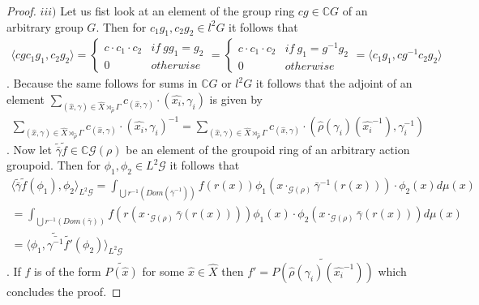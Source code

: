 \documentclass[12pt,a4paper]{scrartcl}
\numberwithin{equation}{section}
\newcommand{\C}{\mathbb{C}} %
\newcommand{\2}{\mathbb{Z} / 2 \mathbb{Z}}
\newcommand{\G}{\mathcal{G}}
\newcommand{\1}{\bar{1}}
\newcommand{\0}{\bar{0}}
\begin{document}
\begin{proof}
	$iii)$ Let us fist look at an element of the group ring $c g \in \C G$ of an arbitrary group $G$. Then for $c_1 g_1, c_2 g_2 \in l^2G$ it follows that 
	\begin{align*}
		\langle c g c_1 g_1, c_2 g_2 \rangle = \begin{cases}
		 	c \cdot c_1 \cdot c_2 & if \ g g_1 = g_2 \\
		 	0 & otherwise
		\end{cases}  = \begin{cases}
		c \cdot c_1 \cdot c_2 & if \ g_1 = g^{-1} g_2 \\
		0 & otherwise
		\end{cases}
		= \langle  c_1 g_1, c g^{-1} c_2 g_2 \rangle
	\end{align*}.
	Because the same follows for sums in $\C G$ or $l^2 G$ it follows that the adjoint of an element $\sum_{(\hat{x}, \gamma) \in \hat{X} \rtimes_{\hat{\rho}} \Gamma} c_{(\hat{x}, \gamma)} \cdot (\hat{x_i}, \gamma_i)$ is given by 
	\begin{align*}
		\sum_{(\hat{x}, \gamma) \in \hat{X} \rtimes_{\hat{\rho}} \Gamma} c_{(\hat{x}, \gamma)} \cdot (\hat{x_i}, \gamma_i)^{-1} = \sum_{(\hat{x}, \gamma) \in \hat{X} \rtimes_{\hat{\rho}} \Gamma} c_{(\hat{x}, \gamma)} \cdot (\hat{\rho}(\gamma_i)(\hat{x_i}^{-1}), \gamma_i^{-1})
	\end{align*}. 
	Now let $\tilde{\bar{\gamma}} \tilde{f} \in \C \G(\rho)$ be an element of the groupoid ring of an arbitrary action groupoid. Then for $\phi_1, \phi_2 \in L^2 \G$ it follows that
	\begin{align*}
		\langle \tilde{\bar{\gamma}} \tilde{f} (\phi_1), \phi_2 \rangle_{L^2 \G} =
		 \int_{\bigcup r^{-1}(Dom(\bar{\gamma}^{-1}))} f(r(x)) \phi_1(x \cdot_{\G (\rho)} \bar{\gamma}^{-1}(r(x))) \cdot \phi_2 (x) d \mu (x) \\
		 = \int_{\bigcup r^{-1}(Dom(\bar{\gamma}))} f(r(x \cdot_{\G (\rho)} \bar{\gamma}(r(x)))) \phi_1(x ) \cdot \phi_2 (x \cdot_{\G (\rho)} \bar{\gamma}(r(x))) d \mu (x) \\
		 = \langle \phi_1 ,\tilde{\bar{\gamma^{-1}}} \tilde{f'} (\phi_2) \rangle_{L^2 \G}
	\end{align*}.
	If $f$ is of the form $\widetilde{P(\hat{x})}$ for some $\hat{x} \in \hat{X}$ then $f' = \widetilde{P(\hat{\rho}(\gamma_i)(\hat{x_i}^{-1}))}$  which concludes the proof.
\end{proof}
\end{document}
